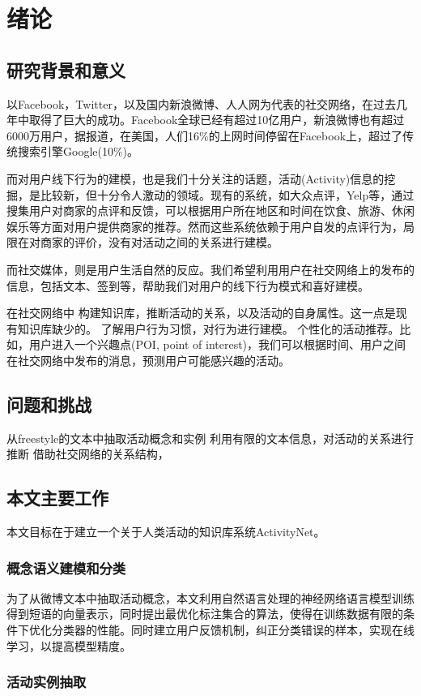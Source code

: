 \chapter{绪论}
\section{研究背景和意义}
以Facebook，Twitter，以及国内新浪微博、人人网为代表的社交网络，在过去几年中取得了巨大的成功。Facebook全球已经有超过10亿用户，新浪微博也有超过6000万用户，据报道，在美国，人们16\%的上网时间停留在Facebook上，超过了传统搜索引擎Google(10\%)。

而对用户线下行为的建模，也是我们十分关注的话题，活动(Activity)信息的挖掘，是比较新，但十分令人激动的领域。现有的系统，如大众点评，Yelp等，通过搜集用户对商家的点评和反馈，可以根据用户所在地区和时间在饮食、旅游、休闲娱乐等方面对用户提供商家的推荐。然而这些系统依赖于用户自发的点评行为，局限在对商家的评价，没有对活动之间的关系进行建模。

而社交媒体，则是用户生活自然的反应。我们希望利用用户在社交网络上的发布的信息，包括文本、签到等，帮助我们对用户的线下行为模式和喜好建模。

在社交网络中
构建知识库，推断活动的关系，以及活动的自身属性。这一点是现有知识库缺少的。
了解用户行为习惯，对行为进行建模。
个性化的活动推荐。比如，用户进入一个兴趣点(POI, point of interest)，我们可以根据时间、用户之间在社交网络中发布的消息，预测用户可能感兴趣的活动。

\section{问题和挑战}
从freestyle的文本中抽取活动概念和实例
利用有限的文本信息，对活动的关系进行推断
借助社交网络的关系结构，

\section{本文主要工作}
本文目标在于建立一个关于人类活动的知识库系统ActivityNet。

\subsection{概念语义建模和分类}
为了从微博文本中抽取活动概念，本文利用自然语言处理的神经网络语言模型训练得到短语的向量表示，同时提出最优化标注集合的算法，使得在训练数据有限的条件下优化分类器的性能。同时建立用户反馈机制，纠正分类错误的样本，实现在线学习，以提高模型精度。
\subsection{活动实例抽取}

